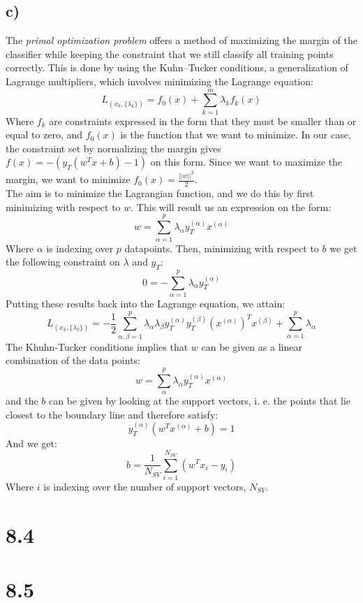 \documentclass[11pt,a4paper]{article}
\begin{document}
\subsection*{c)}
The \textit{primal optimization problem} offers a method of maximizing the margin of the classifier while keeping the constraint that we still classify all training points correctly. This is done by using the Kuhn–Tucker conditions, a generalization of Lagrange multipliers, which involves minimizing the Lagrange equation:
\begin{equation}
  L_{(x_k, \{\lambda_k\})} = f_0(x) + \sum_{k=1}^m \lambda_k f_k(x)
\end{equation}
Where $f_k$ are constraints expressed in the form that they must be smaller than or equal to zero, and $f_0(x)$ is the function that we want to minimize. In our case, the constraint set by normalizing the margin gives $f(x) = -(y_T(w^Tx + b) -1)$ on this form. Since we want to maximize the margin, we want to minimize $f_0(x) = \frac{||w||^2}{2}$.\\
The aim is to minimize the Lagrangian function, and we do this by first minimizing with respect to $w$. This will result us an expression on the form:
\begin{equation}
w = \sum_{\alpha=1}^p \lambda_\alpha y_T^{(\alpha)}x^{(\alpha)}
\end{equation}
Where $\alpha$ is indexing over $p$ datapoints. Then, minimizing with respect to $b$ we get the following constraint on $\lambda$ and $y_T$:
\begin{equation}
0 = - \sum_{\alpha=1}^p \lambda_\alpha y_T^{(\alpha)}
\end{equation}
Putting these results back into the Lagrange equation, we attain:
\begin{equation}
L_{(x_k, \{\lambda_k\})} = -\frac{1}{2} \sum _{\alpha, \beta=1}^p\lambda_\alpha \lambda_\beta y_T^{(\alpha)}y_T^{(\beta)}(x^{(\alpha)})^Tx^{(\beta)}+\sum_{\alpha=1}^p\lambda_\alpha
\end{equation}
The Khuhn-Tucker conditions implies that $w$ can be given as a linear combination of the data points:
\begin{equation}
w = \sum_{\alpha}^p\lambda_\alpha y_T^{(\alpha)}x^{(\alpha)}
\end{equation}
and the $b$ can be given by looking at the support vectors, i. e. the points that lie closest to the boundary line and therefore satisfy:
\begin{equation}
y_T^{(\alpha)}(w^Tx^{(\alpha)}+b) = 1
\end{equation}
And we get:
\begin{equation}
b = \frac{1}{N_{SV}}\sum_{i = 1} ^{N_{SV}}(w^Tx_i - y_i)
\end{equation}
Where $i$ is indexing over the number of support vectors, $N_{SV}$.
\section*{8.4}
\section*{8.5}
\end{document}
